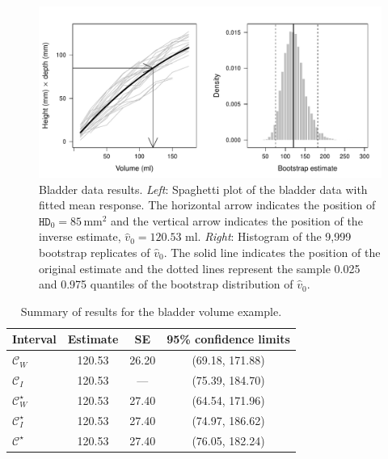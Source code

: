 \documentclass[useAMS,usenatbib,usegraphicx,referee]{biom}\usepackage[]{graphicx}\usepackage[]{color}
\newenvironment{knitrout}{}{} %
\newcommand{\boot}{\star}
\newcommand{\code}[1]{\texttt{#1}}
\begin{document}
\begin{knitrout}
\color{fgcolor}\begin{figure}[]


{\centering \includegraphics[width=0.8\linewidth]{figure/histogram} 

}

\caption[Bladder data results]{Bladder data results. \textit{Left}: Spaghetti plot of the bladder data with fitted mean response. The horizontal arrow indicates the position of $\code{HD}_0 = 85 \mathrm{\, mm^2}$ and the vertical arrow indicates the position of the inverse estimate, $\widehat{v}_0 = 120.53$ ml. \textit{Right}: Histogram of the 9,999 bootstrap replicates of $\widehat{v}_0$. The solid line indicates the position of the original estimate and the dotted lines represent the sample 0.025 and 0.975 quantiles of the bootstrap distribution of $\widehat{v}_0$.\label{fig:histogram}}
\end{figure}


\end{knitrout}


\begin{table}
\caption{Summary of results for the bladder volume example.}
\label{tab:results}
\begin{center}
\begin{tabular}{lccc}
\toprule %
Interval & \multicolumn{1}{c}{Estimate} &  \multicolumn{1}{c}{SE} & \multicolumn{1}{c}{95\% confidence limits} \\ \hline
$\mathcal{C}_W$       & 120.53 & 26.20 & (69.18, 171.88) \\
$\mathcal{C}_I$       & 120.53 & ---           & (75.39, 184.70) \\
$\mathcal{C}^\boot_W$ & 120.53 & 27.40 & (64.54, 171.96) \\
$\mathcal{C}^\boot_I$ & 120.53 & 27.40 & (74.97, 186.62) \\
$\mathcal{C}^\boot$   & 120.53 & 27.40 & (76.05, 182.24) \\
\bottomrule
\end{tabular}\vskip18pt
\end{center}
\end{table}
\end{document}
